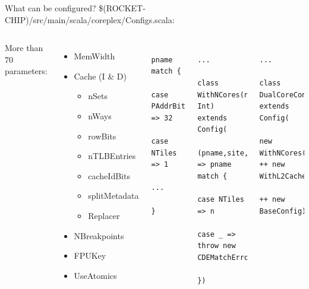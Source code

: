 \documentclass[]{beamer} %
\begin{document}
\begin{frame}[fragile]{What can be configured?}
	\$(ROCKET-CHIP)/src/main/scala/coreplex/Configs.scala:
	\begin{columns}
		More than 70 parameters:
		\begin{itemize}
			\item MemWidth
			\item Cache (I \& D)
				\begin{itemize}
					\item nSets
					\item nWays
					\item rowBits
					\item nTLBEntries
					\item cacheIdBits
					\item splitMetadata
					\item Replacer
				\end{itemize}
			\item NBreakpoints
			\item FPUKey
			\item UseAtomics
		\end{itemize}
		\pause
		\begin{verbatim}
			pname match {
				case PAddrBits => 32
				case NTiles => 1
				...
			}
		\end{verbatim}
		\pause
		\begin{verbatim}
			...
			class WithNCores(n: Int) extends Config(
				(pname,site,here) => pname match {
					case NTiles => n
					case _ => throw new CDEMatchError
				})
		\end{verbatim}
		\pause
		\begin{verbatim}
			...
			class DualCoreConfig extends Config(
			new WithNCores(2) ++ new WithL2Cache
			                  ++ new BaseConfig)
		\end{verbatim}
	\end{columns}
\end{frame}
\end{document}
